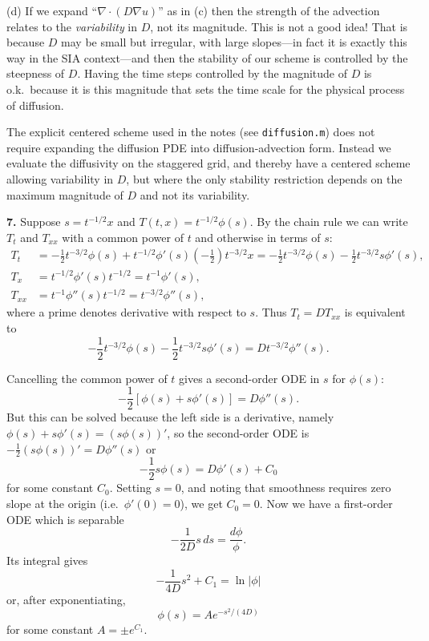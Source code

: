 \documentclass[10pt]{amsart}
\newcommand{\Div}{\nabla\cdot}
\newcommand{\grad}{\nabla}
\newcommand{\prob}[1]{\bigskip\noindent\large\textbf{#1.}\normalsize }
\begin{document}
\medskip
\noindent (d)  If we expand ``$\Div \left(D \grad u\right)$'' as in (c) then the strength of the advection relates to the \emph{variability} in $D$, not its magnitude.  This is not a good idea!  That is because $D$ may be small but irregular, with large slopes---in fact it is exactly this way in the SIA context---and then the stability of our scheme is controlled by the steepness of $D$.  Having the time steps controlled by the magnitude of $D$ is o.k.~because it is this magnitude that sets the time scale for the physical process of diffusion.

The explicit centered scheme used in the notes (see \texttt{diffusion.m}) does not require expanding the diffusion PDE into diffusion-advection form.  Instead we evaluate the diffusivity on the staggered grid, and thereby have a centered scheme allowing variability in $D$, but where the only stability restriction depends on the maximum magnitude of $D$ and not its variability.


\prob{7}  Suppose $s = t^{-1/2} x$ and $T(t,x)=t^{-1/2} \phi(s)$.  By the chain rule we can write $T_t$ and $T_{xx}$ with a common power of $t$ and otherwise in terms of $s$:
\begin{align*}
T_t &= - \frac{1}{2} t^{-3/2} \phi(s) + t^{-1/2} \phi'(s) \left(-\frac{1}{2}\right) t^{-3/2} x = - \frac{1}{2} t^{-3/2} \phi(s) - \frac{1}{2} t^{-3/2} s \phi'(s), \\
T_x &= t^{-1/2} \phi'(s) t^{-1/2} = t^{-1} \phi'(s), \\
T_{xx} &= t^{-1} \phi''(s) t^{-1/2} = t^{-3/2} \phi''(s),
\end{align*}
where a prime denotes derivative with respect to $s$.  Thus $T_t = D T_{xx}$ is equivalent to
    $$- \frac{1}{2} t^{-3/2} \phi(s) - \frac{1}{2} t^{-3/2} s \phi'(s) = D t^{-3/2} \phi''(s).$$

Cancelling the common power of $t$ gives a second-order ODE in $s$ for $\phi(s)$:
    $$- \frac{1}{2} \left[\phi(s) + s \phi'(s)\right] = D \phi''(s).$$
But this can be solved because the left side is a derivative, namely $\phi(s) + s \phi'(s) = \left(s \phi(s)\right)'$, so the second-order ODE is $- \frac{1}{2} \left(s \phi(s)\right)' = D \phi''(s)$ or
    $$- \frac{1}{2} s \phi(s) = D \phi'(s) + C_0$$
for some constant $C_0$.  Setting $s=0$, and noting that smoothness requires zero slope at the origin (i.e.~$\phi'(0)=0$), we get $C_0=0$.  Now we have a first-order ODE which is separable
    $$- \frac{1}{2D} s \,ds = \frac{d\phi}{\phi}.$$
Its integral gives
    $$- \frac{1}{4D} s^2 + C_1 = \ln|\phi|$$
or, after exponentiating,
    $$\phi(s) = A e^{- s^2/(4D)}$$
for some constant $A = \pm e^{C_1}$.
\end{document}

